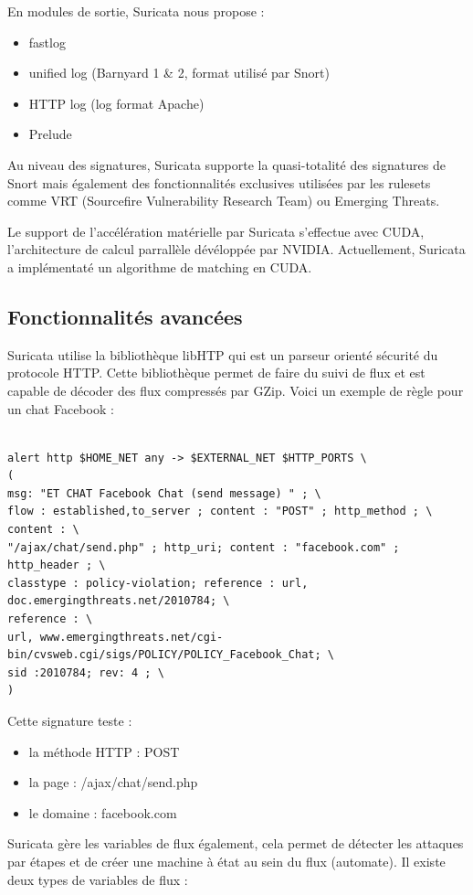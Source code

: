 \documentclass[a4paper,11pt,french]{article}
\begin{document}
En modules de sortie, Suricata nous propose :
\begin{itemize}
\item fastlog
\item unified log (Barnyard 1 \& 2, format utilisé par Snort)
\item HTTP log (log format Apache)
\item Prelude 
\end{itemize}


Au niveau des signatures, Suricata supporte la quasi-totalité des signatures de Snort mais également des fonctionnalités exclusives utilisées par les rulesets comme VRT (Sourcefire Vulnerability Research Team)  ou Emerging Threats.


Le support de l’accélération matérielle par Suricata s’effectue avec CUDA, l’architecture de calcul parrallèle dévéloppée par NVIDIA. Actuellement, Suricata a implémentaté un algorithme de matching en CUDA.


\subsection{Fonctionnalités avancées}

Suricata utilise la bibliothèque libHTP qui est un parseur orienté sécurité du protocole HTTP. Cette bibliothèque permet de faire du suivi de flux et est capable de décoder des flux compressés par GZip. Voici un exemple de règle pour un chat Facebook :

\begin{Verbatim}

alert http $HOME_NET any -> $EXTERNAL_NET $HTTP_PORTS \
(
msg: "ET CHAT Facebook Chat (send message) " ; \
flow : established,to_server ; content : "POST" ; http_method ; \
content : \
"/ajax/chat/send.php" ; http_uri; content : "facebook.com" ; http_header ; \
classtype : policy-violation; reference : url, doc.emergingthreats.net/2010784; \
reference : \
url, www.emergingthreats.net/cgi-bin/cvsweb.cgi/sigs/POLICY/POLICY_Facebook_Chat; \
sid :2010784; rev: 4 ; \
)
\end{Verbatim}

Cette signature teste :
\begin{itemize}
\item la méthode HTTP : POST
\item la page : /ajax/chat/send.php
\item le domaine : facebook.com
\end{itemize}

Suricata gère les variables de flux également, cela permet de détecter les attaques par étapes et de créer une machine à état au sein du flux (automate). Il existe deux types de variables de flux :
\end{document}
